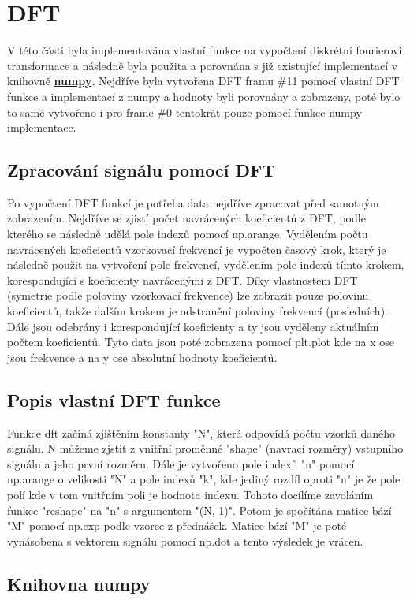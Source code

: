 \section{DFT}

V této části byla implementována vlastní funkce na vypočtení diskrétní fourierovi transformace a následně byla použita a porovnána s již existující implementací v knihovně \hyperref[subs:numpy]{\textbf{numpy}}.
Nejdříve byla vytvořena DFT framu \#11 pomocí vlastní DFT funkce a implementací z numpy a hodnoty byli porovnány a zobrazeny, poté bylo to samé vytvořeno i pro frame \#0 tentokrát pouze pomocí funkce numpy implementace.

\subsection{Zpracování signálu pomocí DFT}
Po vypočtení DFT funkcí je potřeba data nejdříve zpracovat před samotným zobrazením. Nejdříve se zjistí počet navrácených koeficientů z DFT, podle kterého se následně udělá pole indexů pomocí np.arange.
Vydělením počtu navrácených koeficientů vzorkovací frekvencí je vypočten časový krok, který je následně použit na vytvoření pole frekvencí, vydělením pole indexů tímto krokem, korespondující s koeficienty navrácenými z DFT.
Díky vlastnostem DFT (symetrie podle poloviny vzorkovací frekvence) lze zobrazit pouze polovinu koeficientů, takže dalším krokem je odstranění poloviny frekvencí (posledních).
Dále jsou odebrány i korespondující koeficienty a ty jsou vyděleny aktuálním počtem koeficientů.
Tyto data jsou poté zobrazena pomocí plt.plot kde na x ose jsou frekvence a na y ose absolutní hodnoty koeficientů.

\subsection{Popis vlastní DFT funkce}
Funkce dft začíná zjištěním konstanty "N", která odpovídá počtu vzorků daného signálu. N můžeme zjstit z vnitřní proměnné "shape" (navrací rozměry) vstupního signálu a jeho první rozměru.
Dále je vytvořeno pole indexů "n" pomocí np.arange o velikosti "N" a pole indexů "k", kde jediný rozdíl oproti "n" je že pole polí kde v tom vnitřním poli je hodnota indexu. Tohoto docílíme zavoláním funkce "reshape" na "n" s argumentem "(N, 1)".
Potom je spočítána matice bází "M" pomocí np.exp podle vzorce z přednášek. Matice bází "M" je poté vynásobena s vektorem signálu pomocí np.dot a tento výsledek je vrácen.

\subsection{Knihovna numpy}
\label{subs:numpy}

